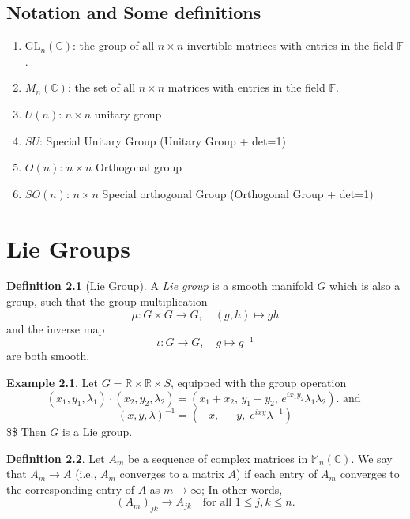\documentclass[
]{book}
\providecommand{\tightlist}{%
  \setlength{\itemsep}{0pt}\setlength{\parskip}{0pt}}
\theoremstyle{definition}
\newtheorem{definition}{Definition}[chapter]
\theoremstyle{definition}
\newtheorem{example}{Example}[chapter]
\theoremstyle{definition}
\theoremstyle{definition}
\theoremstyle{remark}
\begin{document}
\section{Notation and Some definitions}\label{notation-and-some-definitions}

\begin{enumerate}
\def\labelenumi{\arabic{enumi}.}
\tightlist
\item
  \(\mathrm{GL}_n(\mathbb{C})\): the group of all \(n \times n\) invertible matrices with entries in the field \(\mathbb{F}\).
\item
  \(M_n(\mathbb{C})\): the set of all \(n \times n\) matrices with entries in the field \(\mathbb{F}\).
\item
  \(U(n)\): \(n \times n\) unitary group
\item
  \(SU\): Special Unitary Group (Unitary Group + det=1)
\item
  \(O(n)\): \(n \times n\) Orthogonal group
\item
  \(SO(n)\): \(n \times n\) Special orthogonal Group (Orthogonal Group + det=1)
\end{enumerate}

\chapter{Lie Groups}\label{lie-groups}

\begin{definition}[Lie Group]
\protect\hypertarget{def:unnamed-chunk-1}{}\label{def:unnamed-chunk-1}A \emph{Lie group} is a smooth manifold \(G\) which is also a group, such that the group multiplication
\[\mu: G \times G \to G, \quad (g,h) \mapsto gh\]
and the inverse map
\[\iota: G \to G, \quad g \mapsto g^{-1}\]
are both smooth.
\end{definition}

\begin{example}
\protect\hypertarget{exm:unnamed-chunk-2}{}\label{exm:unnamed-chunk-2}Let \(G = \mathbb{R} \times \mathbb{R} \times S\), equipped with the group operation
\[(x_1, y_1, \lambda_1) \cdot (x_2, y_2, \lambda_2) = (x_1 + x_2,\, y_1 + y_2,\, e^{ix_1y_2}\lambda_1 \lambda_2). \text{ and } \]
\[(x,y,\lambda)^{-1}=\left(-x,\; -y,\; e^{ixy}\lambda^{-1}\right)\]\$\$
Then \(G\) is a Lie group.
\end{example}

\begin{definition}
\protect\hypertarget{def:unnamed-chunk-3}{}\label{def:unnamed-chunk-3}Let \(A_m\) be a sequence of complex matrices in \(\mathbb{M}_n(\mathbb{C})\). We say that \(A_m \to A\) (i.e., \(A_m\) converges to a matrix \(A\)) if each entry of \(A_m\) converges to the corresponding entry of \(A\) as \(m \to \infty\); In other words,
\[(A_m)_{jk} \to A_{jk} \quad \text{for all } 1 \leq j, k \leq n.\]
\end{definition}
\end{document}
